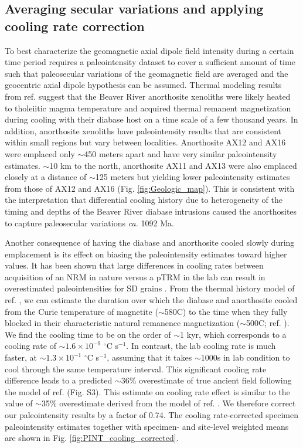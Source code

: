 \documentclass[9pt,twocolumn,twoside,lineno]{pnas-new}
\begin{document}
\subsection*{Averaging secular variations and applying cooling rate correction}
To best characterize the geomagnetic axial dipole field intensity during a certain time period requires a paleointensity dataset to cover a sufficient amount of time such that paleosecular variations of the geomagnetic field are averaged and the geocentric axial dipole hypothesis can be assumed. Thermal modeling results from ref. \citealp{Zhang2021b} suggest that the Beaver River anorthosite xenoliths were likely heated to tholeiitic magma temperature and acquired thermal remanent magnetization during cooling with their diabase host on a time scale of a few thousand years. In addition, anorthosite xenoliths have paleointensity results that are consistent within small regions but vary between localities. Anorthosite AX12 and AX16 were emplaced only $\sim$450 meters apart and have very similar paleointensity estimates. $\sim$10 km to the north, anorthosite AX11 and AX13 were also emplaced closely at a distance of $\sim$125 meters but yielding lower paleointensity estimates from those of AX12 and AX16 (Fig. \ref{fig:Geologic_map}). This is consistent with the interpretation that differential cooling history due to heterogeneity of the timing and depths of the Beaver River diabase intrusions caused the anorthosites to capture paleosecular variations \textit{ca.} 1092 Ma. 

Another consequence of having the diabase and anorthosite cooled slowly during emplacement is its effect on biasing the paleointensity estimates toward higher values. It has been shown that large differences in cooling rates between acquisition of an NRM in nature versus a pTRM in the lab can result in overestimated paleointensities for SD grains \cite{Dodson1980a, Halgedahl1980a, Nagy2021a}. From the thermal history model of ref. \citealp{Zhang2021b}, we can estimate the duration over which the diabase and anorthosite cooled from the Curie temperature of magnetite ($\sim$580\textdegree C) to the time when they fully blocked in their characteristic natural remanence magnetization ($\sim$500\textdegree C; ref. \citealp{Zhang2021b}). We find the cooling time to be on the order of $\sim$1 kyr, which corresponds to a cooling rate of $\sim 1.6\times10^{-9}$ $^\circ$C s$^{-1}$. In contrast, the lab cooling rate is much faster, at $\sim 1.3\times10^{-1}$ $^\circ$C s$^{-1}$, assuming that it takes $\sim$1000s in lab condition to cool through the same temperature interval. This significant cooling rate difference leads to a predicted $\sim$36\% overestimate of true ancient field following the model of ref. \citealp{Halgedahl1980a} (Fig. S3). This estimate on cooling rate effect is similar to the value of $\sim$35\% overestimate derived from the model of ref. \citealp{Nagy2021a}. We therefore correct our paleointensity results by a factor of 0.74. The cooling rate-corrected specimen paleointensity estimates together with specimen- and site-level weighted means are shown in Fig. \ref{fig:PINT_cooling_corrected}.
\end{document}
